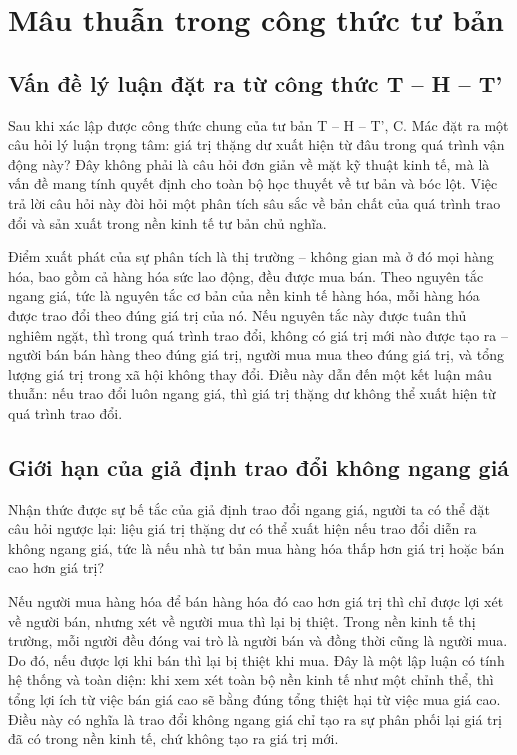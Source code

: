 \section{Mâu thuẫn trong công thức tư bản}
\subsection{Vấn đề lý luận đặt ra từ công thức T – H – T'}
Sau khi xác lập được công thức chung của tư bản T – H – T', C. Mác đặt ra một câu hỏi lý luận trọng tâm: giá trị thặng dư xuất hiện từ đâu trong quá trình vận động này? Đây không phải là câu hỏi đơn giản về mặt kỹ thuật kinh tế, mà là vấn đề mang tính quyết định cho toàn bộ học thuyết về tư bản và bóc lột. Việc trả lời câu hỏi này đòi hỏi một phân tích sâu sắc về bản chất của quá trình trao đổi và sản xuất trong nền kinh tế tư bản chủ nghĩa.

Điểm xuất phát của sự phân tích là thị trường – không gian mà ở đó mọi hàng hóa, bao gồm cả hàng hóa sức lao động, đều được mua bán. Theo nguyên tắc ngang giá, tức là nguyên tắc cơ bản của nền kinh tế hàng hóa, mỗi hàng hóa được trao đổi theo đúng giá trị của nó. Nếu nguyên tắc này được tuân thủ nghiêm ngặt, thì trong quá trình trao đổi, không có giá trị mới nào được tạo ra – người bán bán hàng theo đúng giá trị, người mua mua theo đúng giá trị, và tổng lượng giá trị trong xã hội không thay đổi. Điều này dẫn đến một kết luận mâu thuẫn: nếu trao đổi luôn ngang giá, thì giá trị thặng dư không thể xuất hiện từ quá trình trao đổi.
\subsection{Giới hạn của giả định trao đổi không ngang giá}
Nhận thức được sự bế tắc của giả định trao đổi ngang giá, người ta có thể đặt câu hỏi ngược lại: liệu giá trị thặng dư có thể xuất hiện nếu trao đổi diễn ra không ngang giá, tức là nếu nhà tư bản mua hàng hóa thấp hơn giá trị hoặc bán cao hơn giá trị?

Nếu người mua hàng hóa để bán hàng hóa đó cao hơn giá trị thì chỉ được lợi xét về người bán, nhưng xét về người mua thì lại bị thiệt. Trong nền kinh tế thị trường, mỗi người đều đóng vai trò là người bán và đồng thời cũng là người mua. Do đó, nếu được lợi khi bán thì lại bị thiệt khi mua. Đây là một lập luận có tính hệ thống và toàn diện: khi xem xét toàn bộ nền kinh tế như một chỉnh thể, thì tổng lợi ích từ việc bán giá cao sẽ bằng đúng tổng thiệt hại từ việc mua giá cao. Điều này có nghĩa là trao đổi không ngang giá chỉ tạo ra sự phân phối lại giá trị đã có trong nền kinh tế, chứ không tạo ra giá trị mới.

